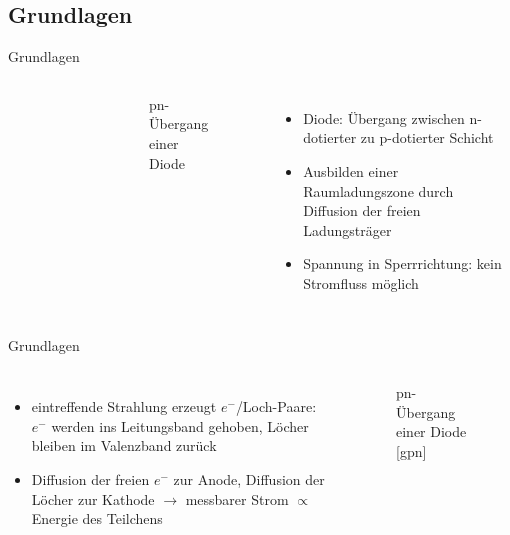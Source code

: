 \subsection[]{Grundlagen}

\begin{frame}{Grundlagen}
    \begin{columns}[T]
	    	\vspace{-0.5cm}
			\begin{figure}[htbp]
			  \centering
			  
			\end{figure}
			\vspace{-1.2cm}
			\begin{figure}[htbp]
			  \centering
			   
			   \vspace{-0.5cm}
			  \caption{pn-Übergang einer Diode}
			\end{figure}
			
	    	\begin{itemize}
	    	  \item Diode: Übergang zwischen n-dotierter zu p-dotierter Schicht
			  \item Ausbilden einer Raumladungszone durch Diffusion der freien Ladungsträger
			  \item Spannung in Sperrrichtung: kein Stromfluss möglich
			\end{itemize}
    \end{columns}
\end{frame}

\begin{frame}{Grundlagen}
    \begin{columns}[T]	
	    	\begin{itemize}
	    	  \item eintreffende Strahlung erzeugt $e^-$/Loch-Paare: $e^-$ werden ins Leitungsband
	    	  gehoben, Löcher bleiben im Valenzband zurück
	    	  \item Diffusion der freien $e^-$ zur Anode, Diffusion der Löcher zur Kathode $\rightarrow$
	    	  messbarer Strom $\propto$ Energie des Teilchens
			\end{itemize}
			
			\begin{figure}[htbp]
			  \centering
			   
			  \caption{pn-Übergang einer Diode [gpn]}
			\end{figure}
    \end{columns}
\end{frame}
